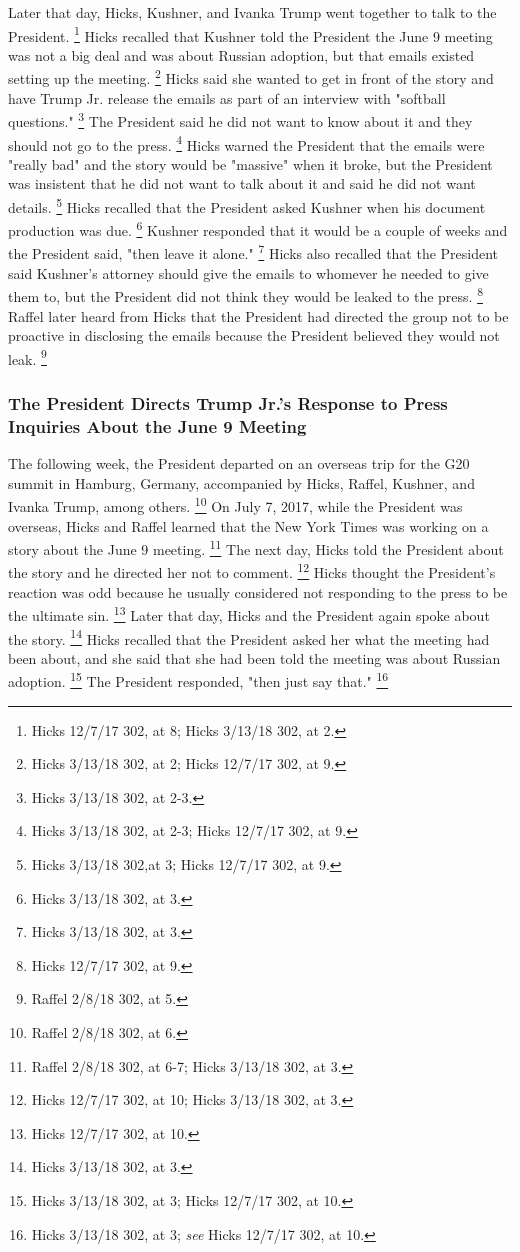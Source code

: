 {Later that day, Hicks, Kushner, and Ivanka Trump went together to talk to the President.%
\footnote{Hicks 12/7/17 302, at 8;
Hicks 3/13/18 302, at 2.}
Hicks recalled that Kushner told the President the June 9 meeting was not a big deal and was about Russian adoption, but that emails existed setting up the meeting.%
\footnote{Hicks 3/13/18 302, at 2;
Hicks 12/7/17 302, at 9.}
Hicks said she wanted to get in front of the story and have Trump Jr. release the emails as part of an interview with "softball questions."%
\footnote{Hicks 3/13/18 302, at 2-3.}
The President said he did not want to know about it and they should not go to the press.%
\footnote{Hicks 3/13/18 302, at 2-3;
Hicks 12/7/17 302, at 9.}
Hicks warned the President that the emails were "really bad" and the story would be "massive" when it broke, but the President was insistent that he did not want to talk about it and said he did not want details.%
\footnote{Hicks 3/13/18 302,at 3;
Hicks 12/7/17 302, at 9.}
Hicks recalled that the President asked Kushner when his document production was due.%
\footnote{Hicks 3/13/18 302, at 3.}
Kushner responded that it would be a couple of weeks and the President said, "then leave it alone."%
\footnote{Hicks 3/13/18 302, at 3.}
Hicks also recalled that the President said Kushner's attorney should give the emails to whomever he needed to give them to, but the President did not think they would be leaked to the press.%
\footnote{Hicks 12/7/17 302, at 9.}
Raffel later heard from Hicks that the President had directed the group not to be proactive in disclosing the emails because the President believed they would not leak.%
\footnote{Raffel 2/8/18 302, at 5.}

\subsubsection{The President Directs Trump Jr.'s Response to Press Inquiries About the June 9 Meeting}

The following week, the President departed on an overseas trip for the G20 summit in Hamburg, Germany, accompanied by Hicks, Raffel, Kushner, and Ivanka Trump, among others.%
\footnote{Raffel 2/8/18 302, at 6.}
On July 7, 2017, while the President was overseas, Hicks and Raffel learned that the New York Times was working on a story about the June 9 meeting.%
\footnote{Raffel 2/8/18 302, at 6-7;
Hicks 3/13/18 302, at 3.}
The next day, Hicks told the President about the story and he directed her not to comment.%
\footnote{Hicks 12/7/17 302, at 10;
Hicks 3/13/18 302, at 3.}
Hicks thought the President's reaction was odd because he usually considered not responding to the press to be the ultimate sin.%
\footnote{Hicks 12/7/17 302, at 10.}
Later that day, Hicks and the President again spoke about the story.%
\footnote{Hicks 3/13/18 302, at 3.}
Hicks recalled that the President asked her what the meeting had been about, and she said that she had been told the meeting was about Russian adoption.%
\footnote{Hicks 3/13/18 302, at 3;
Hicks 12/7/17 302, at 10.}
The President responded, "then just say that."%
\footnote{Hicks 3/13/18 302, at 3;
\textit{see} Hicks 12/7/17 302, at 10.}

}
